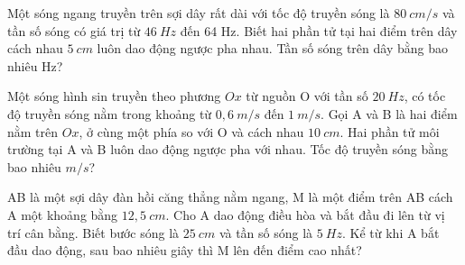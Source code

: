 \begin{ex}
Một sóng ngang truyền trên sợi dây rất dài với tốc độ truyền sóng là $80 ~cm/s$ và tần số sóng có giá trị từ $46 ~Hz$ đến 64 Hz. Biết hai phần tử tại hai điểm trên dây cách nhau $5 ~cm$ luôn dao động ngược pha nhau. Tần số sóng trên dây bằng bao nhiêu Hz?\\  
\end{ex} 


\begin{ex}
Một sóng hình sin truyền theo phương $O x$ từ nguồn O với tần số $20 ~Hz$, có tốc độ truyền sóng nằm trong khoảng từ $0,6\ m/s$ đến $1 ~m/s$. Gọi A và B là hai điểm nằm trên $O x$, ở cùng một phía so với O và cách nhau $10 ~cm$. Hai phần tử môi trường tại A và B luôn dao động ngược pha với nhau. Tốc độ truyền sóng bằng bao nhiêu $m/s$?\\  
\end{ex} 
\begin{ex}
AB là một sợi dây đàn hồi căng thẳng nằm ngang, M là một điểm trên AB cách A một khoảng bằng $12,5 ~cm$. Cho A dao động điều hòa và bắt đầu đi lên từ vị trí cân bằng. Biết bước sóng là $25 ~cm$ và tần số sóng là $5 ~Hz$. Kể từ khi A bắt đầu dao động, sau bao nhiêu giây thì M lên đến điểm cao nhất?\\  
\end{ex} 
